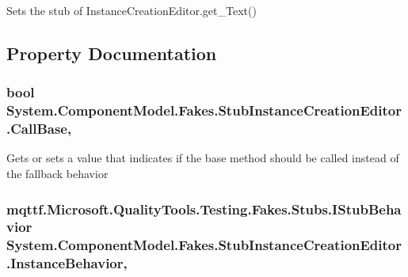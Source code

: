 Sets the stub of Instance\-Creation\-Editor.\-get\-\_\-\-Text()



\subsection{Property Documentation}
\hypertarget{class_system_1_1_component_model_1_1_fakes_1_1_stub_instance_creation_editor_a4e3b9bc216603a8837eba26720f0f774}{
\subsubsection[{Call\-Base}]{\setlength{\rightskip}{0pt plus 5cm}bool System.\-Component\-Model.\-Fakes.\-Stub\-Instance\-Creation\-Editor.\-Call\-Base\hspace{0.3cm}{\ttfamily [get]}, {\ttfamily [set]}}}\label{class_system_1_1_component_model_1_1_fakes_1_1_stub_instance_creation_editor_a4e3b9bc216603a8837eba26720f0f774}


Gets or sets a value that indicates if the base method should be called instead of the fallback behavior

\hypertarget{class_system_1_1_component_model_1_1_fakes_1_1_stub_instance_creation_editor_ac28b8b3055afc1bf1785bc66fd3fce31}{
\subsubsection[{Instance\-Behavior}]{\setlength{\rightskip}{0pt plus 5cm}mqttf.\-Microsoft.\-Quality\-Tools.\-Testing.\-Fakes.\-Stubs.\-I\-Stub\-Behavior System.\-Component\-Model.\-Fakes.\-Stub\-Instance\-Creation\-Editor.\-Instance\-Behavior\hspace{0.3cm}{\ttfamily [get]}, {\ttfamily [set]}}}\label{class_system_1_1_component_model_1_1_fakes_1_1_stub_instance_creation_editor_ac28b8b3055afc1bf1785bc66fd3fce31}


